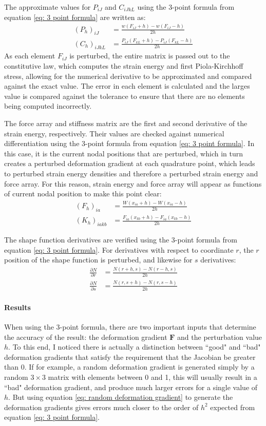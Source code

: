 \documentclass[]{spie}  %
\begin{document}
The approximate values for $P_{iJ}$ and $C_{iJkL}$ using the 3-point formula from equation \ref{eq: 3 point formula} are written as:
\begin{align}
(P_h)_{iJ} &= \frac{w(F_{iJ} + h) - w(F_{iJ} - h)}{2h} \\[1ex]
(C_h)_{iJkL} &= \frac{P_{iJ}(F_{kL} + h) - P_{iJ}(F_{kL} - h)}{2h}
\end{align}
As each element $F_{iJ}$ is perturbed, the entire matrix is passed out to the constitutive law, which computes the strain energy and first Piola-Kirchhoff stress, allowing for the numerical derivative to be approximated and compared against the exact value. The error in each element is calculated and the larges value is compared against the tolerance to ensure that there are no elements being computed incorrectly. 

The force array and stiffness matrix are the first and second derivative of the strain energy, respectively. Their values are checked against numerical differentiation using the 3-point formula from equation \ref{eq: 3 point formula}. In this case, it is the current nodal positions that are perturbed, which in turn creates a perturbed deformation gradient at each quadrature point, which leads to perturbed strain energy densities and therefore a perturbed strain energy and force array. For this reason, strain energy and force array will appear as functions of current nodal position to make this point clear:
\begin{align}
(F_h)_{ia} &= \frac{W(x_{ia} + h) - W(x_{ia} - h)}{2h} \\[1ex]
(K_h)_{iakb} &= \frac{F_{ia}(x_{kb} + h) - F_{ia}(x_{kb} - h)}{2h}
\end{align}

The shape function derivatives are verified using the 3-point formula from equation \ref{eq: 3 point formula}. For derivatives with respect to coordinate $r$, the $r$ position of the shape function is perturbed, and likewise for $s$ derivatives:
\begin{align}
\frac{\partial N}{\partial r} &= \frac{N(r + h, s) - N(r - h, s)}{2h} \\[1ex]
\frac{\partial N}{\partial s} &= \frac{N(r, s + h) - N(r, s - h)}{2h}
\end{align}

\paragraph{Results}
When using the 3-point formula, there are two important inputs that determine the accuracy of the result: the deformation gradient $\bm{F}$ and the perturbation value $h$. To this end, I noticed there is actually a distinction between ``good" and ``bad" deformation gradients that satisfy the requirement that the Jacobian be greater than 0. If for example, a random deformation gradient is generated simply by a random $3 \times 3$ matrix with elements between 0 and 1, this will usually result in a ``bad" deformation gradient, and produce much larger errors for a single value of $h$. But using equation \ref{eq: random deformation gradient} to generate the deformation gradients gives errors much closer to the order of $h^2$ expected from equation \ref{eq: 3 point formula}. 
\end{document}
